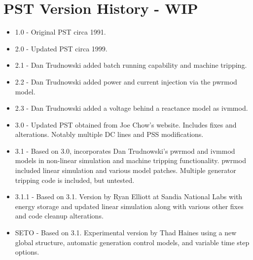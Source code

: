 \chapter{PST Version History - WIP}



\begin{itemize}
 em
\singlespacing
\item 1.0 - Original PST circa 1991.
\item 2.0 - Updated PST circa 1999.
\item 2.1 - Dan Trudnowski added batch running capability and machine tripping.
\item 2.2 - Dan Trudnowski added power and current injection via the pwrmod model.
\item 2.3 - Dan Trudnowski added a voltage behind a reactance model as ivmmod.
\item 3.0 - Updated PST obtained from Joe Chow's website. 
Includes fixes and alterations. 
Notably multiple DC lines and PSS modifications.
\item 3.1 - Based on 3.0, incorporates Dan Trudnowski's pwrmod and ivmmod models in non-linear simulation and machine tripping functionality.
pwrmod included linear simulation and various model patches. 
Multiple generator tripping code is included, but untested.
\item 3.1.1 - Based on 3.1. Version by Ryan Elliott at Sandia National Labs with energy storage and updated linear simulation along with various other fixes and code cleanup alterations. 
\item SETO - Based on 3.1. Experimental version by Thad Haines using a new global structure, automatic generation control models, and variable time step options. 



\end{itemize}
